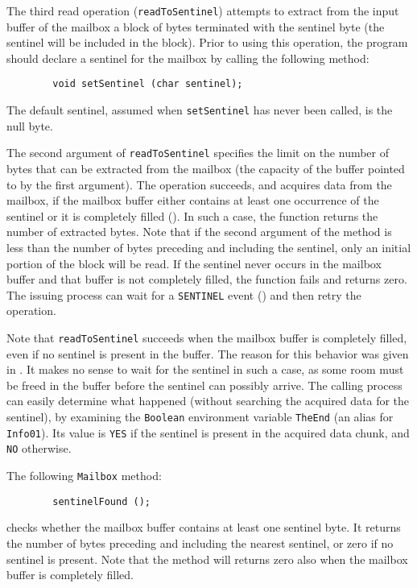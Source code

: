 \medskip

The third read operation ({\tt readToSentinel}) attempts to extract
from the input buffer of the mailbox a block of bytes terminated with
the sentinel byte (the sentinel will be included in the block).
Prior to using this operation, the program should declare a sentinel for
the mailbox by calling the following method:
\begin{verbatim}
        void setSentinel (char sentinel);
\end{verbatim}
The default sentinel, assumed when {\tt setSentinel} has never been called,
is the null byte.

The second argument of {\tt readToSentinel} specifies the limit on the
number of bytes that can be extracted from the mailbox (the capacity of
the buffer pointed to by the first argument).
The operation succeeds, and acquires data from the mailbox, if
the mailbox buffer either contains at least one occurrence of the sentinel or
it is completely filled ().
In such a case, the function returns the number of extracted bytes.
Note that if the second argument of the method is less than the
number of bytes preceding and including the sentinel, only an initial
portion of the block will be read.
If the sentinel never occurs in the mailbox buffer and that buffer is not
completely filled, the function fails and returns zero.
The issuing
process can wait for a {\tt SENTINEL} event () and then
retry the operation.

Note that {\tt readToSentinel} succeeds when the mailbox buffer is
completely filled, even if no sentinel is present in the buffer.
The reason for this behavior was given in .
It makes no sense to wait for the sentinel in such a case, as some
room must be freed in the buffer before the sentinel can possibly
arrive.
The calling process can easily determine what happened (without searching the
acquired data for the sentinel), by examining the {\tt Boolean}
environment variable {\tt TheEnd} (an alias for {\tt Info01}).
Its value is {\tt YES} if the sentinel is present in the acquired data
chunk, and {\tt NO} otherwise.

The following {\tt Mailbox} method:
\begin{verbatim}
        sentinelFound ();
\end{verbatim}
checks whether the mailbox buffer contains at least one
sentinel byte.
It returns the number of bytes preceding and including the nearest
sentinel, or zero if no sentinel is present.
Note that the method will returns zero also when the mailbox buffer is
completely filled.

